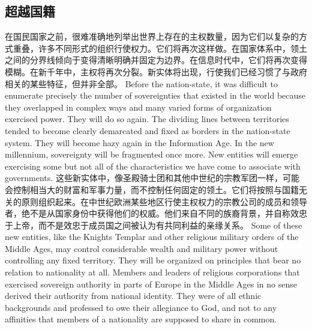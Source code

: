 \subsection{超越国籍}
\begin{paracol}{2}
在国民国家之前，很难准确地列举出世界上存在的主权数量，因为它们以复杂的方式重叠，许多不同形式的组织行使权力。它们将再次这样做。在国家体系中，领土之间的分界线倾向于变得清晰明确并固定为边界。在信息时代中，它们将再次变得模糊。在新千年中，主权将再次分裂。新实体将出现，行使我们已经习惯了与政府相关的某些特征，但并非全部。
\switchcolumn
Before the nation-state, it was difficult to enumerate precisely the number of sovereignties that existed in the world because they overlapped in complex ways and many varied forms of organization exercised power. They will do so again. The dividing lines between territories tended to become clearly demarcated and fixed as borders in the nation-state system. They will become hazy again in the Information Age. In the new millennium, sovereignty will be fragmented once more. New entities will emerge exercising some but not all of the characteristics we have come to associate with governments.
\switchcolumn*
这些新实体中，像圣殿骑士团和其他中世纪的宗教军团一样，可能会控制相当大的财富和军事力量，而不控制任何固定的领土。它们将按照与国籍无关的原则组织起来。在中世纪欧洲某些地区行使主权权力的宗教公司的成员和领导者，绝不是从国家身份中获得他们的权威。他们来自不同的族裔背景，并自称效忠于上帝，而不是效忠于成员国之间被认为有共同利益的亲缘关系。
\switchcolumn
Some of these new entities, like the Knights Templar and other religious military orders of the Middle Ages, may control considerable wealth and military power without controlling any fixed territory. They will be organized on principles that bear no relation to nationality at all. Members and leaders of religious corporations that exercised sovereign authority in parts of Europe in the Middle Ages in no sense derived their authority from national identity. They were of all ethnic backgrounds and professed to owe their allegiance to God, and not to any affinities that members of a nationality are supposed to share in common.
\end{paracol}

